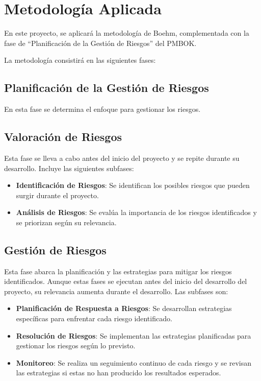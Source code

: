 \section{Metodología Aplicada}

En este proyecto, se aplicará la metodología de Boehm, complementada con la fase de ``Planificación de la Gestión de Riesgos'' del PMBOK.

La metodología consistirá en las siguientes fases:

\subsection{Planificación de la Gestión de Riesgos}
En esta fase se determina el enfoque para gestionar los riesgos.

\subsection{Valoración de Riesgos}
Esta fase se lleva a cabo antes del inicio del proyecto y se repite durante su desarrollo. Incluye las siguientes subfases:

\begin{itemize}
	\item \textbf{Identificación de Riesgos}: Se identifican los posibles riesgos que pueden surgir durante el proyecto.
	\item \textbf{Análisis de Riesgos}: Se evalúa la importancia de los riesgos identificados y se priorizan según su relevancia.
\end{itemize}

\subsection{Gestión de Riesgos}
Esta fase abarca la planificación y las estrategias para mitigar los riesgos identificados. Aunque estas fases se ejecutan antes del inicio del desarrollo del proyecto, su relevancia aumenta durante el desarrollo. Las subfases son:

\begin{itemize}
	\item \textbf{Planificación de Respuesta a Riesgos}: Se desarrollan estrategias específicas para enfrentar cada riesgo identificado.
	\item \textbf{Resolución de Riesgos}: Se implementan las estrategias planificadas para gestionar los riesgos según lo previsto.
	\item \textbf{Monitoreo}: Se realiza un seguimiento continuo de cada riesgo y se revisan las estrategias si estas no han producido los resultados esperados.
\end{itemize}

